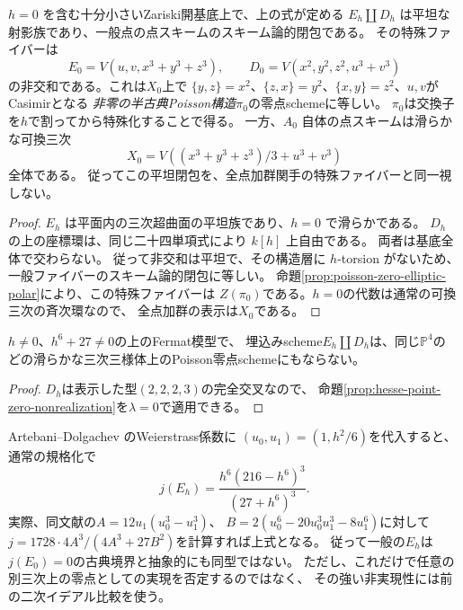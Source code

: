 \begin{corollary}[全点関手の特殊ファイバーと平坦閉包の区別]
\label{cor:fermat-point-flat-closure}
$h=0$ を含む十分小さいZariski開基底上で、上の式が定める
$E_h\amalg D_h$ は平坦な射影族であり、一般点の点スキームのスキーム論的閉包である。
その特殊ファイバーは
\[
 E_0=V(u,v,x^3+y^3+z^3),\qquad
 D_0=V(x^2,y^2,z^2,u^3+v^3)
\]
の非交和である。これは$X_0$上で
$\{y,z\}=x^2$、$\{z,x\}=y^2$、$\{x,y\}=z^2$、$u,v$がCasimirとなる
\emph{非零の半古典Poisson構造}$\pi_0$の零点schemeに等しい。
$\pi_0$は交換子を$h$で割ってから特殊化することで得る。
一方、$A_0$ 自体の点スキームは滑らかな可換三次
\[
 X_0=V\left((x^3+y^3+z^3)/3+u^3+v^3\right)
\]
全体である。
従ってこの平坦閉包を、全点加群関手の特殊ファイバーと同一視しない。
\end{corollary}

\begin{proof}
$E_h$ は平面内の三次超曲面の平坦族であり、$h=0$ で滑らかである。
$D_h$ の上の座標環は、同じ二十四単項式により $k[h]$ 上自由である。
両者は基底全体で交わらない。
従って非交和は平坦で、その構造層に $h$-torsion がないため、
一般ファイバーのスキーム論的閉包に等しい。
命題\ref{prop:poisson-zero-elliptic-polar}により、この特殊ファイバーは
$Z(\pi_0)$である。$h=0$の代数は通常の可換三次の斉次環なので、
全点加群の表示は$X_0$である。
\end{proof}


\begin{corollary}
\label{cor:fermat-point-zero-nonrealization}
$h\ne0$、$h^6+27\ne0$の上のFermat模型で、
埋込みscheme$E_h\amalg D_h$は、同じ$\mathbb P^4$の
どの滑らかな三次三様体上のPoisson零点schemeにもならない。
\end{corollary}
\begin{proof}
$D_h$は表示した型$(2,2,2,3)$の完全交叉なので、
命題\ref{prop:hesse-point-zero-nonrealization}を$\lambda=0$で適用できる。
\end{proof}

\begin{remark}[境界曲線の抽象同型型も変わる]
Artebani--Dolgachev \cite[\S2, equations~(6)--(8)]{AD}のWeierstrass係数に
$(u_0,u_1)=(1,h^2/6)$を代入すると、通常の規格化で
\[
 j(E_h)=\frac{h^6(216-h^6)^3}{(27+h^6)^3}.
\]
実際、同文献の$A=12u_1(u_0^3-u_1^3)$、
$B=2(u_0^6-20u_0^3u_1^3-8u_1^6)$に対して
$j=1728\cdot4A^3/(4A^3+27B^2)$を計算すれば上式となる。
従って一般の$E_h$は$j(E_0)=0$の古典境界と抽象的にも同型ではない。
ただし、これだけで任意の別三次上の零点としての実現を否定するのではなく、
その強い非実現性には前の二次イデアル比較を使う。
\end{remark}

